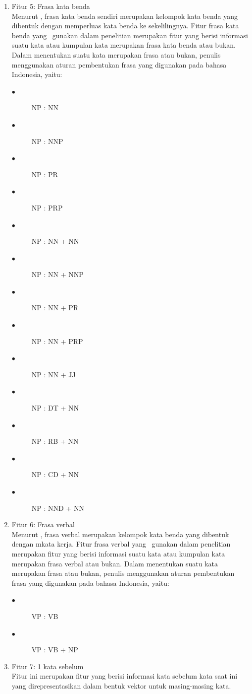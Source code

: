 \begin{enumerate}
	\item Fitur 5: Frasa kata benda\\
	Menurut \cite{hs2005bahasa}, frasa kata benda sendiri merupakan kelompok kata benda yang dibentuk dengan memperluas kata benda ke sekelilingnya. Fitur frasa kata benda yang \saya~gunakan dalam penelitian merupakan fitur yang berisi informasi suatu kata atau kumpulan kata merupakan frasa kata benda atau bukan. Dalam menentukan suatu kata merupakan frasa atau bukan, penulis menggunakan aturan pembentukan frasa yang digunakan pada bahasa Indonesia, yaitu:
	\begin{description}
	 	\item[$\bullet$] NP : NN
	 	\item[$\bullet$] NP : NNP
	 	\item[$\bullet$] NP : PR
	 	\item[$\bullet$] NP : PRP
	 	\item[$\bullet$] NP : NN + NN
	 	\item[$\bullet$] NP : NN + NNP
	 	\item[$\bullet$] NP : NN + PR
	 	\item[$\bullet$] NP : NN + PRP
	 	\item[$\bullet$] NP : NN + JJ
	 	\item[$\bullet$] NP : DT + NN
	 	\item[$\bullet$] NP : RB + NN
	 	\item[$\bullet$] NP : CD + NN
	 	\item[$\bullet$] NP : NND + NN
 \end{description}

 \item Fitur 6: Frasa verbal\\
 Menurut \cite{hs2005bahasa}, frasa verbal merupakan kelompok kata benda yang dibentuk dengan mkata kerja. Fitur frasa verbal yang \saya~gunakan dalam penelitian merupakan fitur yang berisi informasi suatu kata atau kumpulan kata merupakan frasa verbal atau bukan. Dalam menentukan suatu kata merupakan frasa atau bukan, penulis menggunakan aturan pembentukan frasa yang digunakan pada bahasa Indonesia, yaitu:
 \begin{description}
	 	\item[$\bullet$] VP : VB
	 	\item[$\bullet$] VP : VB + NP
 \end{description}

 \item Fitur 7: 1 kata sebelum\\
 Fitur ini merupakan fitur yang berisi informasi kata sebelum kata saat ini yang direpresentasikan dalam bentuk vektor untuk masing-masing kata.
 

\end{enumerate}
